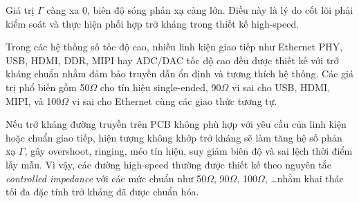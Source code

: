                         Giá trị \(\Gamma\) càng xa 0, biên độ sóng phản xạ càng lớn. Điều này là lý do cốt lõi phải kiểm soát và thực hiện phối hợp trở kháng trong thiết kế high-speed.
                        

                        
                        Trong các hệ thống số tốc độ cao, nhiều linh kiện giao tiếp như Ethernet PHY, USB, HDMI, DDR, MIPI hay ADC/DAC tốc độ cao đều được thiết kế với trở kháng chuẩn nhằm đảm bảo truyền dẫn ổn định và tương thích hệ thống. Các giá trị phổ biến gồm 50\(\Omega\) cho tín hiệu single-ended, 90\(\Omega\) vi sai cho USB, HDMI, MIPI, và 100\(\Omega\) vi sai cho Ethernet cùng các giao thức tương tự.

                        Nếu trở kháng đường truyền trên PCB không phù hợp với yêu cầu của linh kiện hoặc chuẩn giao tiếp, hiện tượng không khớp trở kháng sẽ làm tăng hệ số phản xạ \(\Gamma\), gây overshoot, ringing, méo tín hiệu, suy giảm biên độ và sai lệch thời điểm lấy mẫu. Vì vậy, các đường high-speed thường được thiết kế theo nguyên tắc \textit{controlled impedance} với các mức chuẩn như 50\(\Omega\), 90\(\Omega\), 100\(\Omega\), \ldots nhằm khai thác tối đa đặc tính trở kháng đã được chuẩn hóa.
                    
